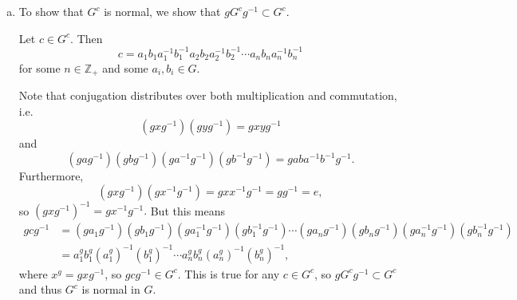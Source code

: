 \documentclass{article}
\begin{document}
\begin{Answer}
\begin{enumerate}[(a)]
  \item{To show that $G^c$ is normal, we show that
        $g G^c g^{-1} \subset G^c$.

        Let $c \in G^c$. Then
        $$
        c = a_1 b_1 a_1^{-1} b_1^{-1}
            a_2 b_2 a_2^{-1} b_2^{-1}
            \cdots
            a_n b_n a_n^{-1} b_n^{-1}
        $$
        for some $n \in \mathbb{Z}_+$ and some $a_i, b_i \in G$.

        Note that conjugation
        distributes over both multiplication and commutation, i.e.
        $$
        (g x g^{-1}) (g y g^{-1}) = g x y g^{-1}
        $$
        and
        $$
        (g a g^{-1})
        (g b g^{-1})
        (g a^{-1} g^{-1})
        (g b^{-1} g^{-1})
      = g a b a^{-1} b^{-1} g^{-1}.
        $$
        Furthermore,
        $$
        (g x g^{-1})(g x^{-1} g^{-1}) = g x x^{-1} g^{-1} = g g^{-1} = e,
        $$
        so $(g x g^{-1})^{-1} = g x^{-1} g^{-1}.$
        But this means
        \begin{align*}
        g c g^{-1} &= (g a_1 g^{-1})(g b_1 g^{-1})
                     (g a_1^{-1} g^{-1})(g b_1^{-1} g^{-1})
                     \cdots
                     (g a_n g^{-1})(g b_n g^{-1})
                     (g a_n^{-1} g^{-1})(g b_n^{-1} g^{-1}) \\
                  &= a_1^g b_1^g (a_1^g)^{-1} (b_1^g)^{-1}
                     \cdots
                     a_n^g b_n^g (a_n^g)^{-1} (b_n^g)^{-1},
        \end{align*}
        where $x^g = g x g^{-1}$, so $g c g^{-1} \in G^c$. This is
        true for any $c \in G^c$, so $g G^c g^{-1} \subset G^c$ and
        thus $G^c$ is normal in $G$.

}
\end{enumerate}
\end{Answer}
\end{document}
